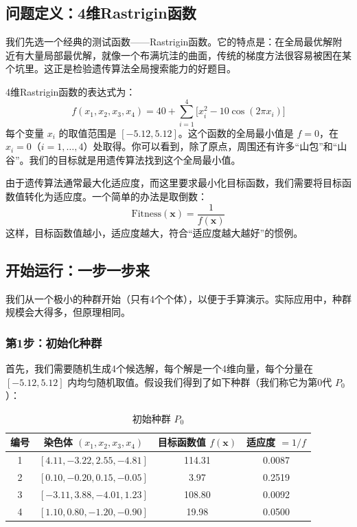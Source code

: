 \documentclass[lang=cn,zihao=-4,a4paper,fontset=windows]{beautybook}
\begin{document}
\subsection{问题定义：4维Rastrigin函数}

我们先选一个经典的测试函数——Rastrigin函数。它的特点是：在全局最优解附近有大量局部最优解，就像一个布满坑洼的曲面，传统的梯度方法很容易被困在某个坑里。这正是检验遗传算法全局搜索能力的好题目。

4维Rastrigin函数的表达式为：
\[
f(x_1, x_2, x_3, x_4) = 40 + \sum_{i=1}^{4} \bigl[ x_i^2 - 10 \cos(2\pi x_i) \bigr]
\]
每个变量 \(x_i\) 的取值范围是 \([-5.12, 5.12]\)。这个函数的全局最小值是 \(f = 0\)，在 \(x_i = 0\)（\(i=1,\dots,4\)）处取得。你可以看到，除了原点，周围还有许多“山包”和“山谷”。我们的目标就是用遗传算法找到这个全局最小值。

由于遗传算法通常最大化适应度，而这里要求最小化目标函数，我们需要将目标函数值转化为适应度。一个简单的办法是取倒数：
\[
\text{Fitness}(\mathbf{x}) = \frac{1}{f(\mathbf{x})}
\]
这样，目标函数值越小，适应度越大，符合“适应度越大越好”的惯例。

\subsection{开始运行：一步一步来}

我们从一个极小的种群开始（只有4个个体），以便于手算演示。实际应用中，种群规模会大得多，但原理相同。

\subsubsection{第1步：初始化种群}

首先，我们需要随机生成4个候选解，每个解是一个4维向量，每个分量在 \([-5.12,5.12]\) 内均匀随机取值。假设我们得到了如下种群（我们称它为第0代 \(P_0\)）：

\begin{table}[h]
\centering
\caption{初始种群 $P_0$}
\begin{tabular}{|c|c|c|c|}
\hline
编号 & 染色体 $(x_1,x_2,x_3,x_4)$ & 目标函数值 $f(\mathbf{x})$ & 适应度 $=1/f$ \\
\hline
1 & $[4.11, -3.22, 2.55, -4.81]$ & 114.31 & 0.0087 \\
2 & $[0.10, -0.20, 0.15, -0.05]$ & 3.97 & 0.2519 \\
3 & $[-3.11, 3.88, -4.01, 1.23]$ & 108.80 & 0.0092 \\
4 & $[1.10, 0.80, -1.20, -0.90]$ & 19.98 & 0.0500 \\
\hline
\end{tabular}
\end{table}
\end{document}
